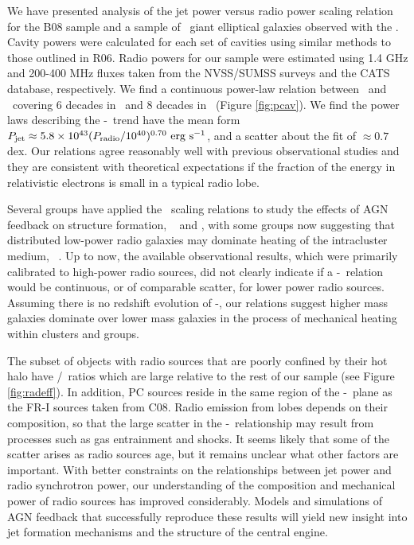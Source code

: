 \documentclass{emulateapj}
\begin{document}
We have presented analysis of the jet power versus radio power scaling
relation for the B08 sample and a sample of \samp\ giant elliptical
galaxies observed with the \cxo. Cavity powers were calculated for
each set of cavities using similar methods to those outlined in
R06. Radio powers for our sample were estimated using 1.4 GHz and
200-400 MHz fluxes taken from the NVSS/SUMSS surveys and the CATS
database, respectively. We find a continuous power-law relation
between \pjet\ and \prad\ covering 6 decades in \prad\ and 8 decades
in \pjet\ (Figure \ref{fig:pcav}). We find the power laws describing
the \pjet-\prad\ trend have the mean form $P_{\rm{jet}} \approx 5.8 \times
10^{43} (P_{\rm{radio}}/10^{40})^{0.70} ~\rm{\mbox{\ensuremath{\rm{erg}}}~\ensuremath{\rm{\mbox{\ensuremath{\rm{s}}}^{-1}}}}$, and a scatter about the fit of
$\approx 0.7$ dex. Our relations agree reasonably well with previous
observational studies and they are consistent with theoretical
expectations if the fraction of the energy in relativistic electrons
is small in a typical radio lobe.

Several groups have applied the \birzan\ scaling relations to study
the effects of AGN feedback on structure formation,
\eg\ \citet{best07} and \citet{2007MNRAS.379..260M}, with some groups
now suggesting that distributed low-power radio galaxies may dominate
heating of the intracluster medium,
\eg\ \citet{2009ApJ...705..854H}. Up to now, the available
observational results, which were primarily calibrated to high-power
radio sources, did not clearly indicate if a \pjet-\prad\ relation
would be continuous, or of comparable scatter, for lower power radio
sources. Assuming there is no redshift evolution of \pjet-\prad, our
relations suggest higher mass galaxies dominate over lower mass
galaxies in the process of mechanical heating within clusters and
groups.

The subset of objects with radio sources that are poorly confined by
their hot halo have \prad/\pjet\ ratios which are large relative to
the rest of our sample (see Figure \ref{fig:radeff}). In addition, PC
sources reside in the same region of the \pjet-\prad\ plane as the
FR-I sources taken from C08. Radio emission from lobes depends on
their composition, so that the large scatter in the
\pjet-\prad\ relationship may result from processes such as gas
entrainment and shocks. It seems likely that some of the scatter
arises as radio sources age, but it remains unclear what other factors
are important. With better constraints on the relationships between
jet power and radio synchrotron power, our understanding of the
composition and mechanical power of radio sources has improved
considerably. Models and simulations of AGN feedback that successfully
reproduce these results will yield new insight into jet formation
mechanisms and the structure of the central engine.
\end{document}
